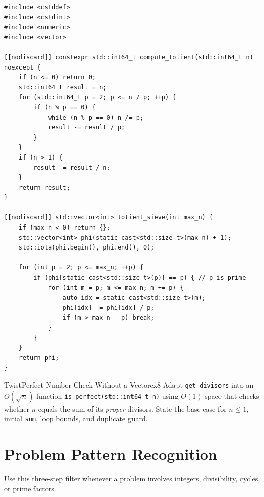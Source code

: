 \documentclass[11pt,a4paper]{article}
\theoremstyle{definition}
\begin{document}
\begin{lstlisting}[caption={Single-Query $O(\sqrt{n})$ Totient and $O(N \log\log N)$ Batch Totient Sieve}]
#include <cstddef>
#include <cstdint>
#include <numeric>
#include <vector>

[[nodiscard]] constexpr std::int64_t compute_totient(std::int64_t n) noexcept {
    if (n <= 0) return 0;
    std::int64_t result = n;
    for (std::int64_t p = 2; p <= n / p; ++p) {
        if (n % p == 0) {
            while (n % p == 0) n /= p;
            result -= result / p;
        }
    }
    if (n > 1) {
        result -= result / n;
    }
    return result;
}

[[nodiscard]] std::vector<int> totient_sieve(int max_n) {
    if (max_n < 0) return {};
    std::vector<int> phi(static_cast<std::size_t>(max_n) + 1);
    std::iota(phi.begin(), phi.end(), 0);

    for (int p = 2; p <= max_n; ++p) {
        if (phi[static_cast<std::size_t>(p)] == p) { // p is prime
            for (int m = p; m <= max_n; m += p) {
                auto idx = static_cast<std::size_t>(m);
                phi[idx] -= phi[idx] / p;
                if (m > max_n - p) break;
            }
        }
    }
    return phi;
}
\end{lstlisting}

\begin{tryitbox}{Twist}{Perfect Number Check Without a Vector}{ex8}
Adapt \texttt{get\_divisors} into an $O(\sqrt{n})$ function \texttt{is\_perfect(std::int64\_t n)} using $O(1)$ space that checks whether $n$ equals the sum of its \emph{proper} divisors. State the base case for $n \le 1$, initial \texttt{sum}, loop bounds, and duplicate guard.
\end{tryitbox}

\section{Problem Pattern Recognition}

Use this three-step filter whenever a problem involves integers, divisibility, cycles, or prime factors.
\end{document}
